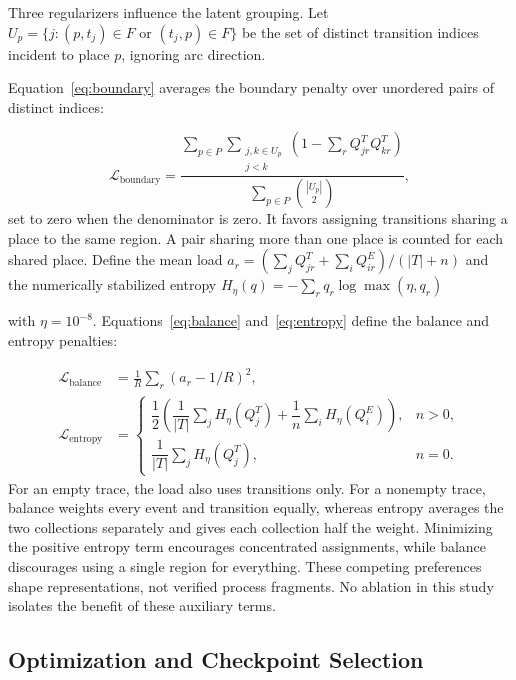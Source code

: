 Three regularizers influence the latent grouping. Let $U_p=\{j:(p,t_j)\in F\text{ or }(t_j,p)\in F\}$ be the set of distinct transition indices incident to place $p$, ignoring arc direction. \begin{revised}Equation~\eqref{eq:boundary} averages the boundary penalty over unordered pairs of distinct indices:\end{revised}
\begin{equation}
 \mathcal L_{\mathrm{boundary}}=
 \frac{\sum_{p\in P}\sum_{\substack{j,k\in U_p\\j<k}}
 (1-\sum_rQ^T_{jr}Q^T_{kr})}{\sum_{p\in P}\binom{|U_p|}{2}},
 \label{eq:boundary}
\end{equation}
set to zero when the denominator is zero. It favors assigning transitions sharing a place to the same region. A pair sharing more than one place is counted for each shared place. Define the mean load $a_r=(\sum_jQ^T_{jr}+\sum_iQ^E_{ir})/(|T|+n)$ and the numerically stabilized entropy $H_\eta(q)=-\sum_rq_r\log\max(\eta,q_r)$ \begin{revised}with $\eta=10^{-8}$. Equations~\eqref{eq:balance} and~\eqref{eq:entropy} define the balance and entropy penalties:\end{revised}
\begin{align}
 \mathcal L_{\mathrm{balance}}&=\frac1R\sum_r(a_r-1/R)^2,\label{eq:balance}\\
 \mathcal L_{\mathrm{entropy}}&=\begin{cases}
 \dfrac12\left(\dfrac1{|T|}\sum_jH_\eta(Q^T_j)+\dfrac1n\sum_iH_\eta(Q^E_i)\right),&n>0,\\[3pt]
 \dfrac1{|T|}\sum_jH_\eta(Q^T_j),&n=0.
 \end{cases}\label{eq:entropy}
\end{align}
For an empty trace, the load also uses transitions only. For a nonempty trace, balance weights every event and transition equally, whereas entropy averages the two collections separately and gives each collection half the weight. Minimizing the positive entropy term encourages concentrated assignments, while balance discourages using a single region for everything. These competing preferences shape representations, not verified process fragments. No ablation in this study isolates the benefit of these auxiliary terms.

\subsection{Optimization and Checkpoint Selection}
\label{sec:optimization}

